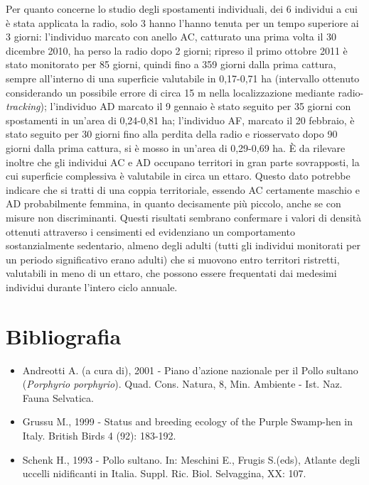 {
Per quanto concerne lo studio degli spostamenti individuali, dei 6
individui a cui \`e stata applicata la radio, solo 3 hanno
l{\textquoteright}hanno tenuta per un tempo superiore ai 3 giorni:
l{\textquoteright}individuo marcato con anello AC, catturato una prima
volta il 30 dicembre 2010, ha perso la radio dopo 2 giorni; ripreso il
primo ottobre 2011 \`e stato monitorato per 85 giorni, quindi fino a
359 giorni dalla prima cattura, sempre all{\textquoteright}interno di
una superficie valutabile in 0,17-0,71 ha (intervallo ottenuto
considerando un possibile errore di circa 15 m nella localizzazione
mediante radio-\textit{tracking}); l{\textquoteright}individuo AD
marcato il 9 gennaio \`e stato seguito per 35 giorni con spostamenti in
un{\textquoteright}area di 0,24-0,81 ha; l{\textquoteright}individuo
AF, marcato il 20 febbraio, \`e stato seguito per 30 giorni fino alla
perdita della radio e riosservato dopo 90 giorni dalla prima cattura,
si \`e mosso in un{\textquoteright}area di 0,29-0,69 ha. \`E da
rilevare inoltre che gli individui AC e AD occupano territori in gran
parte sovrapposti, la cui superficie complessiva \`e valutabile in
circa un ettaro. Questo dato potrebbe indicare che si tratti di una
coppia territoriale, essendo AC certamente maschio e AD probabilmente
femmina, in quanto decisamente pi\`u piccolo, anche se con misure non
discriminanti. Questi risultati sembrano confermare i valori di
densit\`a ottenuti attraverso i censimenti ed evidenziano un
comportamento sostanzialmente sedentario, almeno degli adulti (tutti
gli individui monitorati per un periodo significativo erano adulti) che
si muovono entro territori ristretti, valutabili in meno di un ettaro,
che possono essere frequentati dai medesimi individui durante
l{\textquoteright}intero ciclo annuale.}


\section*{Bibliografia}

\begin{itemize}\itemsep0pt
	\item Andreotti A. (a cura di), 2001 - Piano d{\textquoteright}azione
nazionale per il Pollo sultano (\textit{Porphyrio porphyrio}).
Quad. Cons. Natura, 8, Min. Ambiente - Ist. Naz. Fauna
Selvatica.

	\item Grussu M., 1999 - Status and breeding ecology of the Purple Swamp-hen in
Italy. British Birds 4 (92): 183-192.

	\item Schenk H., 1993 - Pollo sultano. In: Meschini E., Frugis S.(eds),
Atlante degli uccelli nidificanti in Italia. Suppl. Ric. Biol.
Selvaggina, XX: 107.

\end{itemize}
